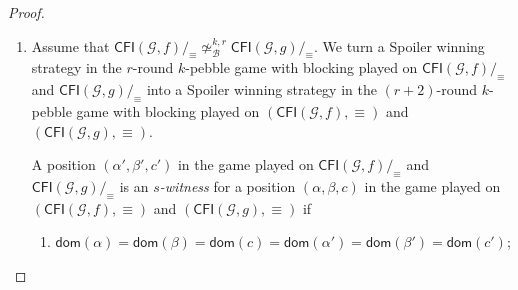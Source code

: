 \documentclass[a4paper,english, thm-restate]{lipics-v2021}
\newcommand{\defining}[1]{\emph{#1}}
\newcommand{\regular}{\mathsf{regular}}
\newcommand{\comp}{\equiv}
\newcommand{\CFIsym}{\mathsf{CFI}}
\newcommand{\CFI}[1]{\CFIsym(#1)}
\newcommand{\compCFI}[2]{\CFI{#1}/_{#2}}
\newcommand{\precompCFI}[2]{{(\CFI{#1},#2)}}
\newcommand{\graphG}{\mathcal{G}}
\newcommand{\dom}{\mathsf{dom}}
\newcommand{\notkbequivr}[2]{\not\simeq_{\mathcal{B}}^{#1,#2}}
\begin{document}
\begin{proof}
\begin{enumerate}
        Finally, we show that after a regular move
        the resulting position has an $(r-s-1)$-witness.
        Picking up a pebble pair from the precompressed CFI graphs
        is transferred to the compressed CFI graphs as  before.
        Now suppose Spoiler wants to place a pebble on the precompressed CFI graphs,
        say the $\ell$-th.
        Assume that Spoiler places the pebble on $\precompCFI{\graphG,f}{\comp}$
        (the case for $\precompCFI{\graphG,g}{\comp}$ is analogous).
        Let $u \in V_{\precompCFI{\graphG,f}{\comp}}$ be the vertex on which Spoiler places the pebble.
        Then in the game on the compressed CFI graphs $V_{\compCFI{\graphG,f}{\comp}}$ and $V_{\compCFI{\graphG,g}{\comp}}$,
        Spoiler places a pebble on $u/_\comp$.
        Assume that Duplicator answers with $v/_\comp$.
        Because we can assume that Duplicator plays color respecting,
        there is a unique vertex $w \in v/_\comp$ that has the same color as $u$.
        We let Duplicator respond with $w$ in the game on the the precompressed CFI graphs.
        Then the resulting position $(\alpha'[\ell \mapsto u],\beta'[\ell \mapsto w], c'[\ell\mapsto \regular])$,
        is an $(r-s-1)$-witness
        for the new position $(\alpha[\ell \mapsto u/_\comp],\beta[\ell \mapsto v/_\comp], c[\ell\mapsto \regular])$. 
        
        \item   
        Assume that $\compCFI{\graphG,f}{\comp} \notkbequivr{k}{r} \compCFI{\graphG,g}{\comp}$.
        We turn a Spoiler winning strategy in the $r$\nobreakdash-round  $k$\nobreakdash-pebble game with blocking played on $\compCFI{\graphG,f}{\comp}$ and $\compCFI{\graphG,g}{\comp}$
        into a Spoiler winning strategy in the $(r+2)$\nobreakdash-round 
        $k$\nobreakdash-pebble game with blocking played on $\precompCFI{\graphG,f}{\comp}$ and $\precompCFI{\graphG,g}{\comp}$.
        
        A position $(\alpha',\beta',c')$ in the game played on $\compCFI{\graphG,f}{\comp}$ and $\compCFI{\graphG,g}{\comp}$
        is an \defining{$s$-witness} for  a position
        $(\alpha,\beta,c)$ in the game played on $\precompCFI{\graphG,f}{\comp}$ and $\precompCFI{\graphG,g}{\comp}$ if
        \begin{enumerate}
        \makeatletter
        \renewcommand{\p@enumii}{}
        \renewcommand{\theenumii}{(\alph{enumii})}
\renewcommand{\labelenumii}{(\alph{enumii})}
        \setlength{\leftskip}{0.5em}
        \makeatother
                \item $\dom(\alpha) = \dom(\beta) =\dom(c) = \dom(\alpha') = \dom(\beta') = \dom(c')$;
        

\end{enumerate}
\end{enumerate}
\end{proof}
\end{document}

